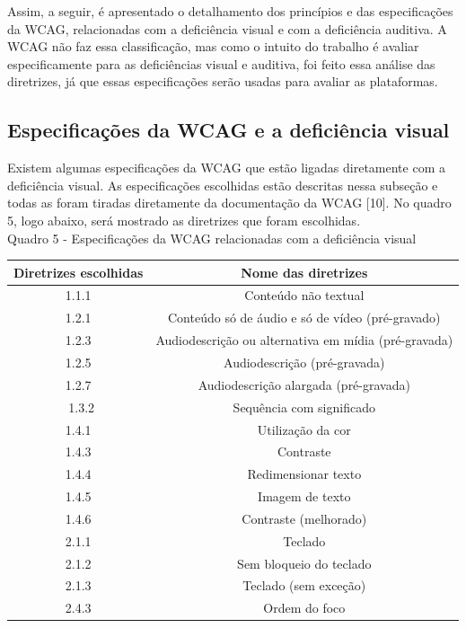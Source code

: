 \documentclass[a4paper]{article}
\begin{document}
\begin{titlepage}
Assim, a seguir, é apresentado o detalhamento dos princípios e das especificações da WCAG, relacionadas com a deficiência visual e com a deficiência auditiva. A WCAG não faz essa classificação, mas como o intuito do trabalho é avaliar especificamente para as deficiências visual e auditiva, foi feito essa análise das diretrizes, já que essas especificações serão usadas para avaliar as plataformas.

\subsection{Especificações da WCAG e a deficiência visual}

Existem algumas especificações da WCAG que estão ligadas diretamente com a deficiência visual. As especificações escolhidas estão descritas nessa subseção e todas as foram tiradas diretamente da documentação da WCAG [10]. No quadro 5, logo abaixo, será mostrado as diretrizes que foram escolhidas.\\

Quadro 5 - Especificações da WCAG relacionadas com a deficiência visual\\[-1cm]
\begin{center}
	\begin{longtable}{|c|c|}
		\hline
		Diretrizes escolhidas & Nome das diretrizes\\
		\hline
		1.1.1 & Conteúdo não textual\\
		\hline
		1.2.1 & Conteúdo só de áudio e só de vídeo (pré-gravado)\\
		\hline
		1.2.3 & Audiodescrição ou alternativa em mídia (pré-gravada)\\
		\hline
		1.2.5 & Audiodescrição (pré-gravada)\\
		\hline
		1.2.7 & Audiodescrição alargada (pré-gravada)\\
		\hline
\		1.3.2 & Sequência com significado\\
		\hline
		1.4.1 & Utilização da cor\\
		\hline
		1.4.3 & Contraste\\
		\hline
		1.4.4 & Redimensionar texto\\
		\hline
		1.4.5 & Imagem de texto\\
		\hline
		1.4.6 & Contraste (melhorado)\\
		\hline
		2.1.1 & Teclado\\
		\hline
		2.1.2 & Sem bloqueio do teclado\\
		\hline
		2.1.3 & Teclado (sem exceção)\\
		\hline
		2.4.3 & Ordem do foco\\
		\hline
	\end{longtable}
\end{center}


\end{titlepage}
\end{document}

